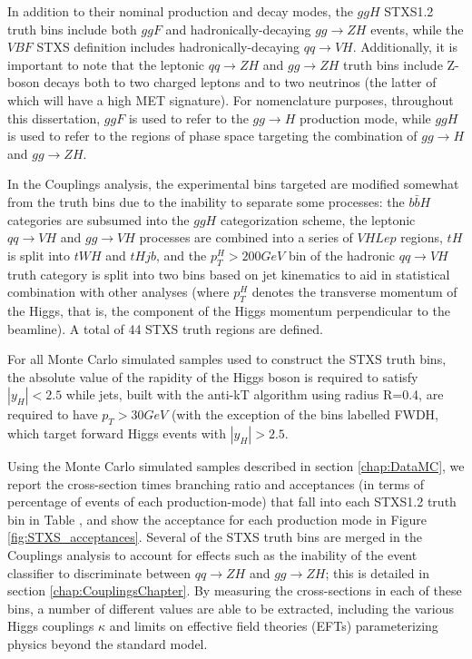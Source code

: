 In addition to their nominal production and decay modes, the $ggH$ STXS1.2 truth bins include both $ggF$ and hadronically-decaying $gg \rightarrow ZH$ events, while the $VBF$ STXS definition includes hadronically-decaying $qq \rightarrow VH$. Additionally, it is important to note that the leptonic $qq \rightarrow ZH$ and $gg \rightarrow ZH$ truth bins include Z-boson decays both to two charged leptons and to two neutrinos (the latter of which will have a high MET signature). For nomenclature purposes, throughout this dissertation, $ggF$ is used to refer to the $gg \rightarrow H$ production mode, while $ggH$ is used to refer to the regions of phase space targeting the combination of $gg \rightarrow H$ and $gg \rightarrow ZH$.

In the Couplings analysis, the experimental bins targeted are modified somewhat from the truth bins due to the inability to separate some processes: the $b\bar{b}H$ categories are subsumed into the $ggH$ categorization scheme, the leptonic $qq \rightarrow VH$ and $gg \rightarrow VH$ processes are combined into a series of $VHLep$ regions, $tH$ is split into $tWH$ and $tHjb$, and the $p_{T}^H > 200 GeV$ bin of the hadronic $qq \rightarrow VH$ truth category is split into two bins based on jet kinematics to aid in statistical combination with other analyses (where $p_{T}^{H}$ denotes the transverse momentum of the Higgs, that is, the component of the Higgs momentum perpendicular to the beamline). A total of 44 STXS truth regions are defined.

For all Monte Carlo simulated samples used to construct the STXS truth bins, the absolute value of the rapidity of the Higgs boson is required to satisfy $|y_{H}| < 2.5$ while jets, built with the anti-kT algorithm \cite{Cacciari_2008} using radius R=0.4, are required to have $p_{T} > 30 GeV$ (with the exception of the bins labelled FWDH, which target forward Higgs events with $|y_{H}| > 2.5$.

Using the Monte Carlo simulated samples described in section \ref{chap:DataMC}, we report the cross-section times branching ratio and acceptances (in terms of percentage of events of each production-mode) that fall into each STXS1.2 truth bin in Table \cite{STXS_cross_sections}, and show the acceptance for each production mode in Figure \ref{fig:STXS_acceptances}. Several of the STXS truth bins are merged in the Couplings analysis to account for effects such as the inability of the event classifier to discriminate between $qq \rightarrow ZH$ and $gg \rightarrow ZH$; this is detailed in section \ref{chap:CouplingsChapter}. By measuring the cross-sections in each of these bins, a number of different values are able to be extracted, including the various Higgs couplings $\kappa$ and limits on effective field theories (EFTs) parameterizing physics beyond the standard model.

